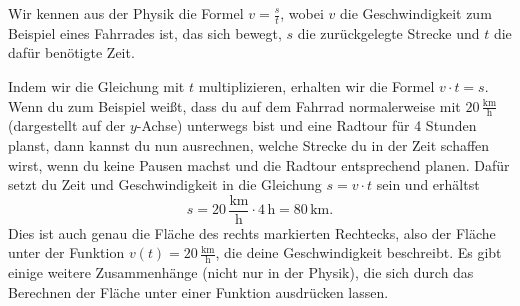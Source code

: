 \documentclass[../../main.tex]{subfiles}
\begin{document}
\begin{example}{}
    Wir kennen aus der Physik die Formel $v=\frac{s}{t}$, wobei $v$ die Geschwindigkeit zum Beispiel eines Fahrrades ist,
    das sich bewegt, $s$ die zurückgelegte Strecke und $t$ die dafür benötigte Zeit.

    Indem wir die Gleichung mit $t$ multiplizieren, erhalten wir die Formel $v\cdot t=s$. Wenn du zum Beispiel weißt, 
    dass du auf dem Fahrrad normalerweise mit $20\,\frac{\text{km}}{\text{h}}$ (dargestellt auf der $y$-Achse) unterwegs 
    bist und eine Radtour für 4 Stunden planst, dann kannst du nun ausrechnen, welche Strecke du in der Zeit schaffen
    wirst, wenn du keine Pausen machst und die Radtour entsprechend planen. Dafür setzt du Zeit und Geschwindigkeit in
    die Gleichung $s=v\cdot t$ sein und erhältst
    \[s=20\,\frac{\text{km}}{\text{h}}\cdot 4\,\text{h}=80\,\text{km}.\]
    Dies ist auch genau die Fläche des rechts markierten Rechtecks, also der Fläche unter der Funktion 
    $v(t)=20\,\frac{\text{km}}{\text{h}}$, die deine Geschwindigkeit beschreibt. Es gibt einige weitere Zusammenhänge
    (nicht nur in der Physik), die sich durch das Berechnen der Fläche unter einer Funktion ausdrücken lassen.
\end{example}
\end{document}
